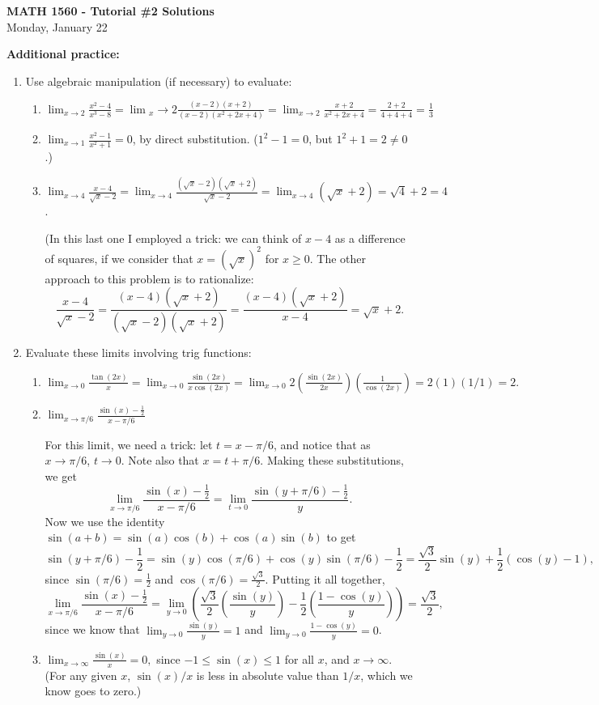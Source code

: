 \documentclass[12pt]{article}
\newcommand{\di}{\displaystyle}
\begin{document}
\author{Instructor: Sean Fitzpatrick}
\thispagestyle{empty}
\begin{center}
{\bf MATH 1560 - Tutorial \#2 Solutions}\\
Monday, January 22
\end{center}


\textbf{Additional practice:}
\begin{enumerate}
\item Use algebraic manipulation (if necessary) to evaluate:
\begin{enumerate}
\item $\di\lim_{x\to 2}\frac{x^2-4}{x^3-8} = \lim{_x\to 2}\frac{(x-2)(x+2)}{(x-2)(x^2+2x+4)}=\lim_{x\to 2}\frac{x+2}{x^2+2x+4} = \frac{2+2}{4+4+4}=\frac{1}{3}$
\item $\di\lim_{x\to 1}\frac{x^2-1}{x^2+1} = 0$, by direct substitution. ($1^2-1=0$, but $1^2+1=2\neq 0$.)
\item $\di\lim_{x\to 4}\frac{x-4}{\sqrt{x}-2} = \lim_{x\to 4}\frac{(\sqrt{x}-2)(\sqrt{x}+2)}{\sqrt{x}-2}=\lim_{x\to 4}(\sqrt{x}+2)=\sqrt{4}+2=4$.

(In this last one I employed a trick: we can think of $x-4$ as a difference of squares, if we consider that $x=(\sqrt{x})^2$ for $x\geq 0$. The other approach to this problem is to rationalize:
\[
\frac{x-4}{\sqrt{x}-2}=\frac{(x-4)(\sqrt{x}+2)}{(\sqrt{x}-2)(\sqrt{x}+2)} = \frac{(x-4)(\sqrt{x}+2)}{x-4}=\sqrt{x}+2.
\]
\end{enumerate}


\item Evaluate these limits involving trig functions:

\begin{enumerate}
\item $\di\lim_{x\to 0}\frac{\tan(2x)}{x}=\lim_{x\to 0}\frac{\sin(2x)}{x\cos(2x)} = \lim_{x\to 0}2\left(\frac{\sin(2x)}{2x}\right)\left(\frac{1}{\cos(2x)}\right) = 2(1)(1/1)=2.$
\item $\di\lim_{x\to \pi/6}\frac{\sin(x)-\frac12}{x-\pi/6}$

For this limit, we need a trick: let $t=x-\pi/6$, and notice that as $x\to \pi/6$, $t\to 0$. Note also that $x=t+\pi/6$. Making these substitutions, we get
\[
\lim_{x\to \pi/6}\frac{\sin(x)-\frac12}{x-\pi/6} = \lim_{t\to 0}\frac{\sin(y+\pi/6)-\frac12}{y}.
\]
Now we use the identity $\sin(a+b)=\sin(a)\cos(b)+\cos(a)\sin(b)$ to get
\[
\sin(y+\pi/6)-\frac12 = \sin(y)\cos(\pi/6)+\cos(y)\sin(\pi/6)-\frac12 = \frac{\sqrt{3}}{2}\sin(y)+\frac12(\cos(y)-1),
\]
since $\sin(\pi/6) = \frac12$ and $\cos(\pi/6)=\frac{\sqrt{3}}{2}$. Putting it all together,
\[
\lim_{x\to \pi/6}\frac{\sin(x)-\frac12}{x-\pi/6} = \lim_{y\to 0}\left(\frac{\sqrt{3}}{2}\left(\frac{\sin(y)}{y}\right)-\frac12\left(\frac{1-\cos(y)}{y}\right)\right)=\frac{\sqrt{3}}{2},
\]
since we know that $\di\lim_{y\to 0}\frac{\sin(y)}{y}=1$ and $\di \lim_{y\to 0}\frac{1-\cos(y)}{y}=0$.
\item $\di\lim_{x\to \infty}\frac{\sin(x)}{x} = 0,$
since $-1\leq \sin(x)\leq 1$ for all $x$, and $x\to \infty$. (For any given $x$, $\sin(x)/x$ is less in absolute value than $1/x$, which we know goes to zero.)
\end{enumerate}


\end{enumerate}
\end{document}
